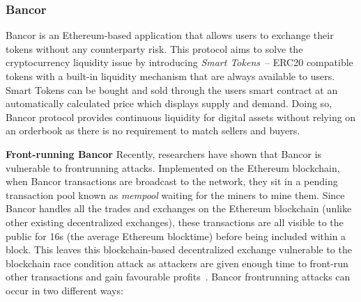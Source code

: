 




\subsubsection{Bancor} %
Bancor is an Ethereum-based application that allows users to exchange their tokens without any counterparty risk. This protocol aims to solve the cryptocurrency liquidity issue by introducing \textit{Smart Tokens}~\cite{hertzog2017bancor}-- ERC20 compatible tokens with a built-in liquidity mechanism that are always available to users. Smart Tokens can be bought and sold through the users smart contract at an automatically calculated price which displays supply and demand. Doing so, Bancor protocol provides continuous liquidity for digital assets without relying on an orderbook as there is no requirement to match sellers and buyers.

\par\noindent\textbf{Front-running Bancor} Recently, researchers have shown that Bancor is vulnerable to frontrunning attacks. Implemented on the Ethereum blockchain, when Bancor transactions are broadcast to the network, they sit in a pending transaction pool known as \textit{mempool} waiting for the miners to mine them. Since Bancor handles all the trades and exchanges on the Ethereum blockchain (unlike other existing decentralized exchanges), these transactions are all visible to the public for 16s (the average Ethereum blocktime) before being included within a block. This leaves this blockchain-based decentralized exchange vulnerable to the blockchain race condition attack as attackers are given enough time to front-run other transactions and gain favourable profits~\cite{BancorIs7:online}. Bancor frontrunning attacks can occur in two different ways:


